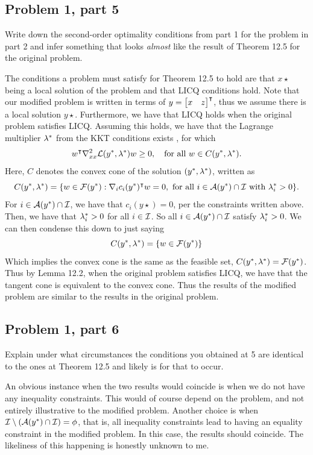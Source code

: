 \subsection{Problem 1, part 5}
Write down the second-order optimality conditions from part 1 for the problem in part 2 and infer something that looks \textit{almost} like the result of Theorem 12.5 for the original problem. 
\partbreak
\begin{solution}

    The conditions a problem must satisfy for Theorem 12.5 to hold are that $x\star$ being a local solution of the problem and that LICQ conditions hold. Note that our modified problem is written in terms of $y = \mqty[x&z]\T$, thus we assume there is a local solution $y\star$. Furthermore, we have that LICQ holds when the original problem satisfies LICQ. Assuming this holds, we have that the Lagrange multiplier $\mathrm{\lambda}^*$ from the KKT conditions exists , for which
    \[w^\intercal \nabla_{xx}^2\mathcal{L}(y^*, \mathrm{\lambda}^*)w \geq 0 ,\quad \text{for all } w \in C(y^*, \mathrm{\lambda}^*).\]
    Here, $C$ denotes the convex cone of the solution $(y^*, \mathrm{\lambda}^*)$, written as
    \[C(y^*, \mathrm{\lambda}^*) = \{ w \in \mathcal{F}(y^*) : \nabla_ic_i(y^*)^\intercal w = 0, \text{ for all } i \in \mathcal{A}(y^*) \cap \mathcal{I} \text{ with } \mathrm{\lambda}_i^* > 0\}.\]
    For $i \in \mathcal{A}(y^*) \cap \mathcal{I}$, we have that $c_i(y\star) = 0$, per the constraints written above. Then, we have that $\mathrm{\lambda}_i^* > 0$ for all $i \in \mathcal{I}$. So all $i \in \mathcal{A}(y^*) \cap \mathcal{I}$ satisfy $\mathrm{\lambda}_i^* > 0$. We can then condense this down to just saying
    \[C(y^*, \mathrm{\lambda}^*) = \{ w \in \mathcal{F}(y^*)\}\]
    Which implies the convex cone is the same as the feasible set, $C(y^*, \mathrm{\lambda}^*) = \mathcal{F}(y^*)$. Thus by Lemma 12.2, when the original problem satisfies LICQ, we have that the tangent cone is equivalent to the convex cone. Thus the results of the modified problem are similar to the results in the original problem.  
\end{solution}

\newpage
\subsection{Problem 1, part 6}
Explain under what circumstances the conditions you obtained at 5 are identical to the ones at Theorem 12.5 and likely is for that to occur. 
\partbreak
\begin{solution}

    An obvious instance when the two results would coincide is when we do not have any inequality constraints. This would of course depend on the problem, and not entirely illustrative to the modified problem. Another choice is when $\mathcal{I} \setminus (\mathcal{A}(y^*) \cap \mathcal{I}) = \phi$, that is, all inequality constraints lead to having an equality constraint in the modified problem. In this case, the results should coincide. The likeliness of this happening is honestly unknown to me.
\end{solution}
\newpage
